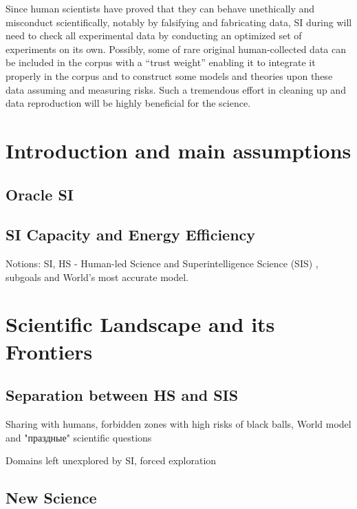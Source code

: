 \documentclass[a4paper,11pt]{article}
\begin{document}
Since human scientists have proved that they can behave unethically and misconduct scientifically, notably by falsifying and fabricating data, SI during will need to check all experimental data by conducting an optimized set of experiments on its own. Possibly, some of rare original human-collected data can be included in the corpus with a ``trust weight'' enabling it to integrate it properly in the corpus and to construct some models and theories upon these data assuming and measuring risks. Such a tremendous effort in cleaning up and data reproduction will be highly beneficial for the science.

\newpage

	\section{Introduction and main assumptions}

        \subsection{Oracle SI}

        \subsection{SI Capacity and Energy Efficiency}

        Notions: SI, HS - Human-led Science  and Superintelligence Science (SIS) , subgoals and World's most accurate model.

    \section{Scientific Landscape and its Frontiers}

        \subsection{Separation between HS and SIS}

        Sharing with humans, forbidden zones with high risks of black balls, World model and "праздные" scientific questions

        Domains left unexplored by SI, forced exploration

        \subsection{New Science}
\end{document}
